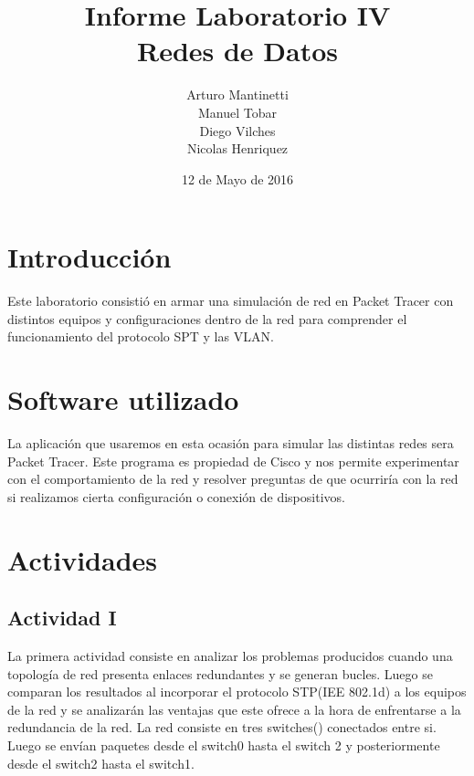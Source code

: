 \documentclass[spanish]{udpreport}
\title{Informe Laboratorio IV \\ Redes de Datos}
\author{Arturo Mantinetti \\ Manuel Tobar \\ Diego Vilches \\ Nicolas Henriquez}
\date{12 de Mayo de 2016}
\begin{document}
\maketitle

\tableofcontents

\chapter{Introducción}

Este laboratorio consistió en armar una simulación de red en Packet Tracer con distintos equipos y configuraciones dentro de la red para comprender el funcionamiento del protocolo SPT y las VLAN.

\chapter{Software utilizado}
La aplicación que usaremos en esta ocasión para simular las distintas redes sera Packet Tracer. Este programa es propiedad de Cisco y nos permite experimentar con el comportamiento de la red y resolver preguntas de que ocurriría con la red si realizamos cierta configuración o conexión de dispositivos.

\chapter{Actividades}

\section{Actividad I}
La primera actividad consiste en analizar los problemas producidos cuando una topología de red presenta enlaces redundantes y se generan bucles. Luego se comparan los resultados al incorporar el protocolo STP(IEE 802.1d) a los equipos de la red y se analizarán las ventajas que este ofrece a la hora de enfrentarse a la redundancia de la red.
La red consiste en tres switches()  conectados entre si. Luego se envían paquetes desde el switch0 hasta el switch 2 y posteriormente desde el switch2 hasta el switch1.
\end{document}
